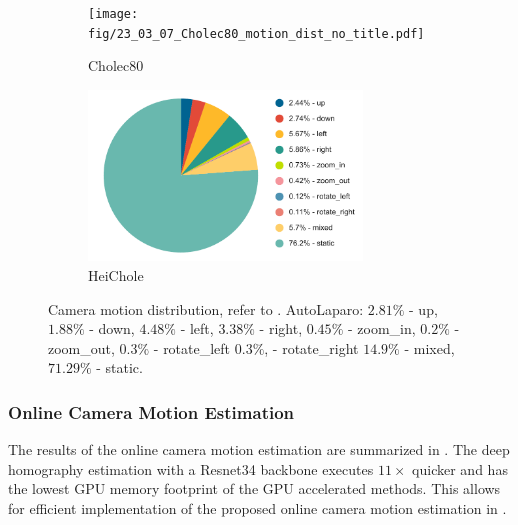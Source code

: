 \begin{figure}
    \centering
    \begin{subfigure}[b]{\textwidth}
        \centering
        \texttt{[image: fig/23\_03\_07\_Cholec80\_motion\_dist\_no\_title.pdf]}
        \caption{Cholec80}
    \end{subfigure}
    \hfill
    \centering
    \begin{subfigure}[b]{\textwidth}
        \centering
        \includegraphics[width=0.8\textwidth]{fig/23_03_07_HeiChole_motion_dist_no_title.pdf}
        \caption{HeiChole}
    \end{subfigure}
    \caption{Camera motion distribution, refer to . AutoLaparo: $2.81\%$ - up, $1.88\%$ - down, $4.48\%$ - left, $3.38\%$ - right, $0.45\%$ - zoom\_in, $0.2\%$ - zoom\_out, $0.3\%$ - rotate\_left $0.3\%$, - rotate\_right $14.9\%$ - mixed, $71.29\%$ - static.}
    \label{c3:fig:camera_motion_distribution}
\end{figure}

\subsubsection{Online Camera Motion Estimation}
The results of the online camera motion estimation are summarized in . The deep homography estimation with a Resnet34 backbone executes $11\times$ quicker and has the lowest GPU memory footprint of the GPU accelerated methods. This allows for efficient implementation of the proposed online camera motion estimation in .

